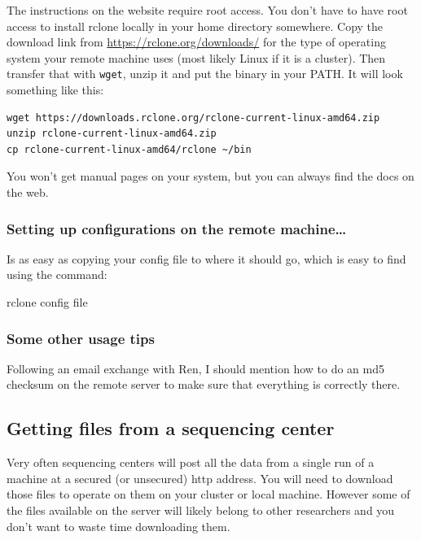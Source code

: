 \documentclass[]{krantz}
\makeatletter
\newenvironment{Shaded}{\begin{snugshade}}{\end{snugshade}}
\newcommand{\ExtensionTok}[1]{#1}
\newcommand{\NormalTok}[1]{#1}
\newenvironment{kframe}{%
\medskip{}
\setlength{\fboxsep}{.8em}
 \def\at@end@of@kframe{}%
 \ifinner\ifhmode%
  \def\at@end@of@kframe{\end{minipage}}%
  \begin{minipage}{\columnwidth}%
 \fi\fi%
 \def\FrameCommand##1{\hskip\@totalleftmargin \hskip-\fboxsep
 \colorbox{shadecolor}{##1}\hskip-\fboxsep
     \hskip-\linewidth \hskip-\@totalleftmargin \hskip\columnwidth}%
 \MakeFramed {\advance\hsize-\width
   \@totalleftmargin\z@ \linewidth\hsize
   \@setminipage}}%
 {\par\unskip\endMakeFramed%
 \at@end@of@kframe}
\renewenvironment{Shaded}{\begin{kframe}}{\end{kframe}}
\makeatother
\begin{document}
The instructions on the website require root access. You don't have to have root
access to install rclone locally in your home directory somewhere.
Copy the download link from \url{https://rclone.org/downloads/} for
the type of operating system your remote machine uses (most likely Linux if it is a cluster).
Then transfer that with \texttt{wget}, unzip it and put the binary in your PATH. It will look
something like this:

\begin{verbatim}
wget https://downloads.rclone.org/rclone-current-linux-amd64.zip
unzip rclone-current-linux-amd64.zip
cp rclone-current-linux-amd64/rclone ~/bin
\end{verbatim}

You won't get manual pages on your system, but you can always find the docs on the web.

\hypertarget{setting-up-configurations-on-the-remote-machine}{%
\subsubsection{Setting up configurations on the remote machine\ldots{}}\label{setting-up-configurations-on-the-remote-machine}}

Is as easy as copying your config file to where it should go, which
is easy to find using the command:

\begin{Shaded}
\begin{Highlighting}[]
\ExtensionTok{rclone}\NormalTok{ config file}
\end{Highlighting}
\end{Shaded}

\hypertarget{some-other-usage-tips}{%
\subsubsection{Some other usage tips}\label{some-other-usage-tips}}

Following an email exchange with Ren, I should mention how to do an md5
checksum on the remote server to make sure that everything is correctly there.

\hypertarget{get-seqs}{%
\subsection{Getting files from a sequencing center}\label{get-seqs}}

Very often sequencing centers will post all the data from a single
run of a machine at a secured (or unsecured) http address. You will
need to download those files to operate on them on your cluster or
local machine. However some of the files available on the server
will likely belong to other researchers and you don't want to waste time
downloading them.
\end{document}
